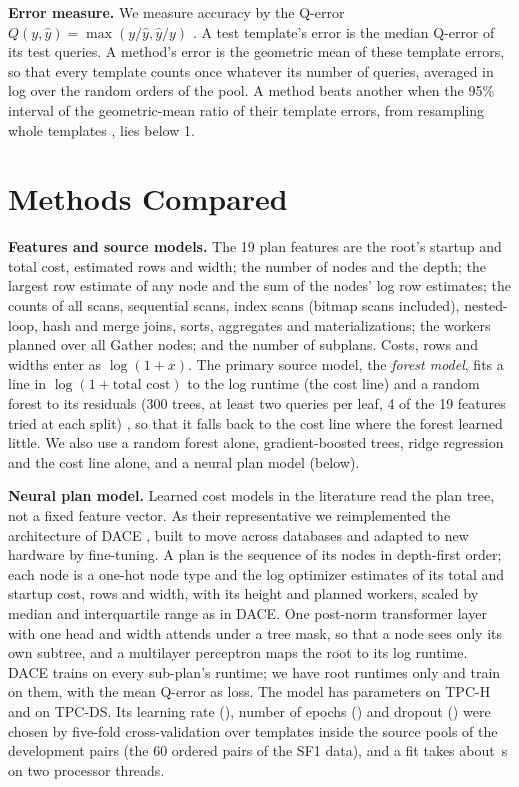 \documentclass[conference]{IEEEtran}
\begin{document}
\textbf{Error measure.} We measure accuracy by the Q-error
$Q(y,\hat y)=\max(y/\hat y,\hat y/y)$ \cite{moerkotte2009}. A test
template's error is the median Q-error of its test queries. A method's
error is the geometric mean of these template errors, so that every
template counts once whatever its number of queries, averaged in log over
the random orders of the pool. A method beats another when the 95\% interval of the
geometric-mean ratio of their template errors, from resampling whole
templates \cite{efron1993}, lies below 1.

\section{Methods Compared}
\label{sec:methods}

\textbf{Features and source models.} The 19 plan features are the root's
startup and total cost, estimated rows and width; the number of nodes and
the depth; the largest row estimate of any node and the sum of the nodes'
log row estimates; the counts of all scans, sequential scans, index scans
(bitmap scans included), nested-loop, hash and merge joins, sorts,
aggregates and materializations; the workers planned over all Gather nodes;
and the number of subplans. Costs, rows and widths enter as $\log(1+x)$.
The primary source model, the \emph{forest model}, fits a line in $\log(1+\text{total cost})$ to the
log runtime (the cost line) and a random forest to its residuals (300
trees, at least two queries per leaf, 4 of the 19 features tried at each
split) \cite{breiman2001,pedregosa2011}, so that it falls back to the cost
line where the forest learned little. We also use a random forest alone,
gradient-boosted trees, ridge regression and the cost line alone, and a
neural plan model (below).

\textbf{Neural plan model.} Learned cost models in the literature read the
plan tree, not a fixed feature vector. As their representative we
reimplemented the architecture of DACE \cite{liang2024dace}, built to move
across databases and adapted to new hardware by fine-tuning. A plan is the
sequence of its nodes in depth-first order; each node is a one-hot node type
and the log optimizer estimates of its total and startup cost, rows and
width, with its height and planned workers, scaled by median and
interquartile range as in DACE. One post-norm transformer layer with one
head and width \NNDevHidden{} attends under a tree mask, so that a node sees
only its own subtree, and a multilayer perceptron maps the root to its log
runtime. DACE trains on every sub-plan's runtime; we have root runtimes only
and train on them, with the mean Q-error as loss. The model has
\NNDevTpchParams{} parameters on TPC-H and \NNDevTpcdsParams{} on TPC-DS.
Its learning rate (\NNDevLr), number of epochs (\NNDevEpochs) and dropout
(\NNDevDropout) were chosen by five-fold cross-validation over templates
inside the source pools of the development pairs (the 60 ordered pairs of
the SF1 data), and a fit takes about \NNDevSourceSeconds\,s
on two processor threads.
\end{document}

